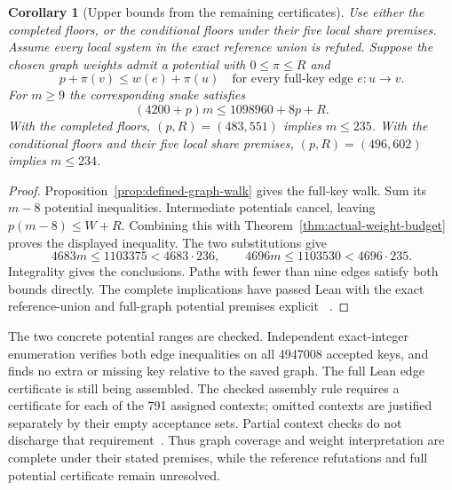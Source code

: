 \documentclass[11pt,a4paper]{article}
\newtheorem{corollary}[theorem]{Corollary}
\theoremstyle{definition}
\theoremstyle{remark}
\begin{document}
\begin{corollary}[Upper bounds from the remaining certificates]\label{cor:reference-potential-bounds}
Use either the completed floors, or the conditional floors under their five
local share premises. Assume every local system in the exact reference union
is refuted. Suppose the chosen graph weights admit a potential with
$0\le\pi\le R$ and
\[
p+\pi(v)\le w(e)+\pi(u)
\quad\text{for every full-key edge }e:u\to v.
\]
For $m\ge9$ the corresponding snake satisfies
\[
(4200+p)m\le1098960+8p+R.
\]
With the completed floors, $(p,R)=(483,551)$ implies $m\le235$.
With the conditional floors and their five local share premises,
$(p,R)=(496,602)$ implies $m\le234$.
\end{corollary}
\begin{proof}
Proposition~\ref{prop:defined-graph-walk} gives the full-key walk. Sum its
$m-8$ potential inequalities. Intermediate potentials cancel, leaving
$p(m-8)\le W+R$. Combining this with
Theorem~\ref{thm:actual-weight-budget} proves the displayed inequality. The
two substitutions give
\[
4683m\le1103375<4683\cdot236,
\qquad
4696m\le1103530<4696\cdot235.
\]
Integrality gives the conclusions. Paths with fewer than nine edges satisfy
both bounds directly. The complete implications have passed Lean with the
exact reference-union and full-graph potential premises explicit
~\cite{referenceunionarchive}.
\end{proof}

The two concrete potential ranges are checked. Independent exact-integer
enumeration verifies both edge inequalities on all 4947008 accepted keys,
and finds no extra or missing key relative to the saved graph. The full
Lean edge certificate is still being assembled. The checked assembly rule
requires a certificate for each of the 791 assigned contexts; omitted
contexts are justified separately by their empty acceptance sets. Partial
context checks do not discharge that requirement~\cite{potentialcertificatearchive}.
Thus graph coverage and weight interpretation are complete under their
stated premises, while the reference refutations and full potential
certificate remain unresolved.
\end{document}
